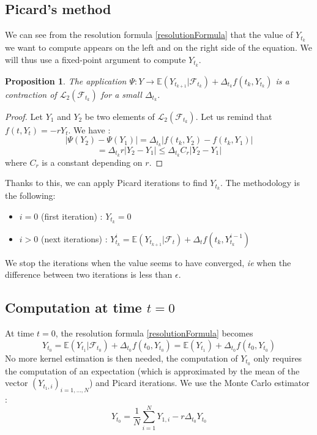 \documentclass[a4paper,11pt,english]{book}
\newtheorem{prop}{Proposition}
\begin{document}
\subsection{Picard's method}
We can see from the resolution formula \eqref{resolutionFormula} that the value of $Y_{t_{k}}$ we want to compute appears on the left and on the right side of the equation. We will thus use a fixed-point argument to compute $Y_{t_{k}}$.

\begin{prop}
The application $\Psi : Y \rightarrow \mathbb{E}(Y_{t_{k+1}}|\mathcal{F}_{t_{k}}) + \Delta_{t_k}f(t_{k},Y_{t_{k}})$ is a contraction of $\mathcal{L}_{2}(\mathcal{F}_{t_{k}})$ for a small $\Delta_{t_{k}}$.
\end{prop}

\begin{proof}
Let $Y_{1}$ and $Y_{2}$ be two elements of $\mathcal{L}_{2}(\mathcal{F}_{t_{k}})$. Let us remind that $f(t,Y_t)=-rY_t$. We have : $$|\Psi(Y_{2})-\Psi(Y_{1})|=\Delta_{t_{k}}|f(t_{k},Y_{2})-f(t_{k},Y_{1})|$$
$$=\Delta_{t_{k}}r |Y_{2}-Y_{1}|\leq \Delta_{t_{k}} C_{r}|Y_{2}-Y_{1}|$$
where $C_{r}$ is a constant depending on $r$.
\end{proof}
Thanks to this, we can apply Picard iterations to find $Y_{t_{k}}$. The methodology is the following:
\begin{itemize}
    \item $i=0$ (first iteration) : $Y_{t_{k}}=0$
    \item $i>0$ (next iterations) : $Y_{t_{k}}^{i}=\mathbb{E}(Y_{t_{k+1}}|\mathcal{F}_{t}) + \Delta_{t}f(t_{k},Y_{t_{k}}^{i-1})$
\end{itemize}
We stop the iterations when the value seems to have converged, \textit{ie} when the difference between two iterations is less than $\epsilon$.
\subsection{Computation at time $t=0$}
\label{subsec:computation-0}
At time $t=0$, the resolution formula \eqref{resolutionFormula} becomes $$Y_{t_{0}} = \mathbb{E}(Y_{t_{1}}|\mathcal{F}_{t_{0}}) + \Delta_{t_{0}}f(t_{0},Y_{t_{0}})=\mathbb{E}(Y_{t_{1}}) + \Delta_{t_{0}}f(t_{0},Y_{t_{0}})$$
No more kernel estimation is then needed, the computation of $Y_{t_{0}}$ only requires the computation of an expectation (which is approximated by the mean of the vector $(Y_{t_1,i})_{i=1,\ldots,N}$) and Picard iterations. We use the Monte Carlo estimator :
$$Y_{t_{0}} = \frac{1}{N}\sum_{i=1}^{N}Y_{1,i}-r\Delta_{t_{0}}Y_{t_{0}}$$
\end{document}
